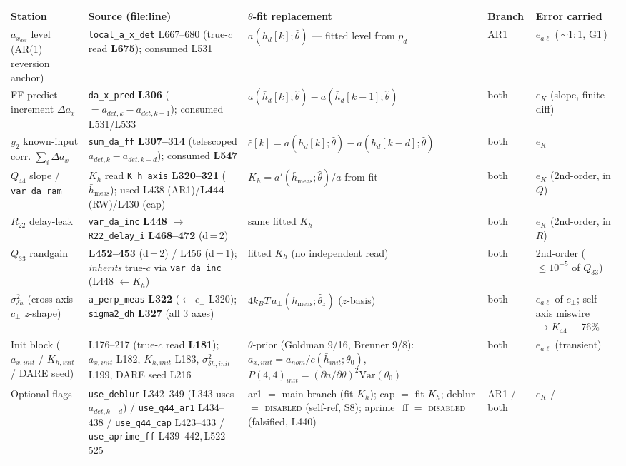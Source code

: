 \documentclass[11pt,a4paper,fontset=none]{ctexart}
\newcommand{\hbd}{\bar h_d}
\newcommand{\hbm}{\bar h_{\mathrm{meas}}}
\newcommand{\adet}{a_{x_{det}}}
\newcommand{\ealev}{e_{a\ell}}
\begin{document}
\medskip
{\footnotesize\setlength{\tabcolsep}{4pt}
\begin{tabular}{@{}p{2.35cm} p{3.35cm} p{4.85cm} p{0.95cm} p{2.55cm}@{}}
\toprule
\textbf{Station} & \textbf{Source (file:line)} & \textbf{$\theta$-fit replacement} & \textbf{Branch} & \textbf{Error carried} \\
\midrule
$\adet$ level (AR(1) reversion anchor) &
\texttt{local\_a\_x\_det} L667--680 (true-$c$ read \textbf{L675}); consumed L531 &
$a(\hbd[k];\hat\theta)$ --- fitted level from $p_d$ &
AR1 &
$\ealev$ (\,$\sim\!1{:}1$, G1\,) \\
\addlinespace
FF predict increment $\Delta a_x$ &
\texttt{da\_x\_pred} \textbf{L306} ($=a_{det,k}\!-\!a_{det,k-1}$); consumed L531/L533 &
$a(\hbd[k];\hat\theta)-a(\hbd[k{-}1];\hat\theta)$ &
both &
$e_K$ (slope, finite-diff) \\
\addlinespace
$y_2$ known-input corr. $\sum_i\Delta a_x$ &
\texttt{sum\_da\_ff} \textbf{L307--314} (telescoped $a_{det,k}\!-\!a_{det,k-d}$); consumed \textbf{L547} &
$\hat c[k]=a(\hbd[k];\hat\theta)-a(\hbd[k{-}d];\hat\theta)$ &
both &
$e_K$ \\
\addlinespace
$Q_{44}$ slope / \texttt{var\_da\_ram} &
$K_h$ read \texttt{K\_h\_axis} \textbf{L320--321} ($\hbm$); used L438 (AR1)/\textbf{L444} (RW)/L430 (cap) &
$K_h = a'(\hbm;\hat\theta)/a$ from fit &
both &
$e_K$ (2nd-order, in $Q$) \\
\addlinespace
$R_{22}$ delay-leak &
\texttt{var\_da\_inc} \textbf{L448} $\to$ \texttt{R22\_delay\_i} \textbf{L468--472} (d\,{=}\,2) &
same fitted $K_h$ &
both &
$e_K$ (2nd-order, in $R$) \\
\addlinespace
$Q_{33}$ randgain &
\textbf{L452--453} (d\,{=}\,2) / L456 (d\,{=}\,1); \emph{inherits} true-$c$ via \texttt{var\_da\_inc} (L448 $\leftarrow K_h$) &
fitted $K_h$ (no independent read) &
both &
2nd-order ($\le\!10^{-5}$ of $Q_{33}$) \\
\addlinespace
$\sigma^2_{\delta h}$ (cross-axis $c_\perp$ $z$-shape) &
\texttt{a\_perp\_meas} \textbf{L322} ($\leftarrow c_\perp$ L320); \texttt{sigma2\_dh} \textbf{L327} (all 3 axes) &
$4k_BT\,a_\perp(\hbm;\hat\theta_z)$ ($z$-basis) &
both &
$\ealev$ of $c_\perp$; self-axis miswire $\to K_{44}\,{+}76\%$ \\
\addlinespace
Init block ($a_{x,init}$ / $K_{h,init}$ / DARE seed) &
L176--217 (true-$c$ read \textbf{L181}); $a_{x,init}$ L182, $K_{h,init}$ L183, $\sigma^2_{\delta h,init}$ L199, DARE seed L216 &
$\theta$-prior (Goldman 9/16, Brenner 9/8): $a_{x,init}=a_{nom}/c(\bar h_{init};\theta_0)$, $P(4,4)_{init}=(\partial a/\partial\theta)^2\mathrm{Var}(\theta_0)$ &
both &
$\ealev$ (transient) \\
\addlinespace
Optional flags &
\texttt{use\_deblur} L342--349 (L343 uses $a_{det,k-d}$) / \texttt{use\_q44\_ar1} L434--438 / \texttt{use\_q44\_cap} L423--433 / \texttt{use\_aprime\_ff} L439--442,\,L522--525 &
ar1 $=$ main branch (fit $K_h$); cap $=$ fit $K_h$; deblur $=$ \textsc{disabled} (self-ref, S8); aprime\_ff $=$ \textsc{disabled} (falsified, L440) &
AR1 / both &
$e_K$ / --- \\
\bottomrule
\end{tabular}
}
\end{document}
